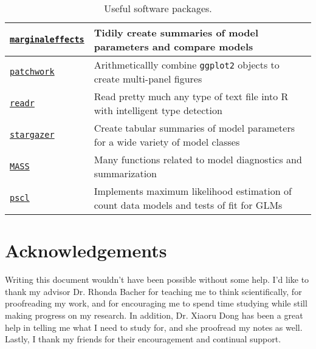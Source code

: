 \documentclass{report}
\begin{document}
\begin{table}[h]
\begin{tabular}{||l l||}
  \hline
  \href{https://cran.r-project.org/web/packages/marginaleffects/index.html}{\texttt{marginaleffects}} & Tidily create summaries of model parameters and compare models \\
  \hline
  \href{https://cran.r-project.org/web/packages/patchwork/index.html}{\texttt{patchwork}} & Arithmeticallly combine \texttt{ggplot2} objects to create multi-panel figures \\
  \hline
  \href{https://cran.r-project.org/web/packages/readr/index.html}{\texttt{readr}} & Read pretty much any type of text file into R with intelligent type detection \\
  \hline
  \href{https://cran.r-project.org/web/packages/stargazer/index.html}{\texttt{stargazer}} & Create tabular summaries of model parameters for a wide variety of model classes \\
  \hline
  \href{https://cran.r-project.org/web/packages/MASS/index.html}{\texttt{MASS}} & Many functions related to model diagnostics and summarization \\
  \hline
  \href{https://cran.r-project.org/web/packages/pscl/index.html}{\texttt{pscl}} & Implements maximum likelihood estimation of count data models and tests of fit for GLMs \\
  \hline
\end{tabular}
\caption{Useful software packages.}
\label{table:useful-software}
\end{table}

\chapter*{Acknowledgements}

Writing this document wouldn't have been possible without some help. I'd like to thank my advisor Dr. Rhonda Bacher for teaching me to think scientifically, for proofreading my work, and for encouraging me to spend time studying while still making progress on my research. In addition, Dr. Xiaoru Dong has been a great help in telling me what I need to study for, and she proofread my notes as well. Lastly, I thank my friends for their encouragement and continual support. 

\newpage

\printbibliography
\end{document}
